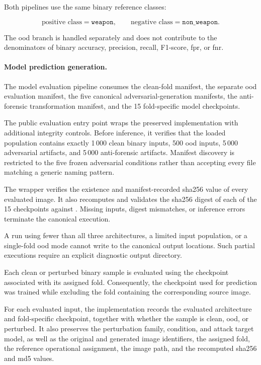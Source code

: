 Both pipelines use the same binary reference classes:

\[
\text{positive class}
=
\texttt{weapon},
\qquad
\text{negative class}
=
\texttt{non\_weapon}.
\]

The \gls{ood} branch is handled separately and does not contribute to the
denominators of binary accuracy, precision, recall, F1-score, \gls{fpr}, or
\gls{fnr}.

\paragraph{Model prediction generation.}

The model evaluation pipeline consumes the clean-fold manifest, the
separate \gls{ood} evaluation manifest, the five canonical
adversarial-generation manifests, the anti-forensic transformation manifest,
and the 15 fold-specific model checkpoints.

The public evaluation entry point wraps the preserved implementation with
additional integrity controls. Before inference, it verifies that the loaded
population contains exactly 1\,000 clean binary inputs, 500 \gls{ood} inputs,
5\,000 adversarial artifacts, and 5\,000 anti-forensic artifacts. Manifest
discovery is restricted to the five frozen adversarial conditions rather than
accepting every file matching a generic naming pattern.

The wrapper verifies the existence and manifest-recorded \gls{sha256} value of
every evaluated image. It also recomputes and validates the \gls{sha256} digest
of each of the 15 checkpoints against
. Missing inputs, digest mismatches, or
inference errors terminate the canonical execution.

A run using fewer than all three architectures, a limited input population, or
a single-fold \gls{ood} mode cannot write to the canonical output locations.
Such partial executions require an explicit diagnostic output directory.

Each clean or perturbed binary sample is evaluated using the checkpoint
associated with its assigned fold. Consequently, the checkpoint used for
prediction was trained while excluding the fold containing the corresponding
source image.

For each evaluated input, the implementation records the evaluated architecture
and fold-specific checkpoint, together with whether the sample is clean,
\gls{ood}, or perturbed. It also preserves the perturbation family, condition,
and attack target model, as well as the original and generated image
identifiers, the assigned fold, the reference operational assignment, the image
path, and the recomputed \gls{sha256} and \gls{md5} values.

